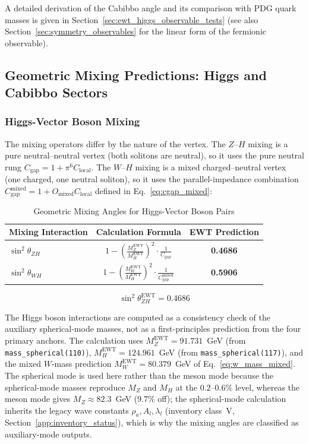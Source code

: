 \documentclass[10pt,a4paper]{article}
\begin{document}
A detailed derivation of the Cabibbo angle and its comparison with
PDG quark masses is given in Section~\ref{sec:ewt_higgs_observable_tests}
(see also Section~\ref{sec:symmetry_observables} for the linear form
of the fermionic observable).

\subsection{Geometric Mixing Predictions: Higgs and Cabibbo Sectors}

\subsubsection{Higgs-Vector Boson Mixing}

The mixing operators differ by the nature of the vertex. The
$Z$--$H$ mixing is a pure neutral--neutral vertex (both solitons are
neutral), so it uses the pure neutral rung $C_{\text{gap}} = 1 + \pi^6
C_{\text{local}}$. The $W$--$H$ mixing is a mixed charged--neutral
vertex (one charged, one neutral soliton), so it uses the
parallel-impedance combination $C_{\text{gap}}^{\text{mixed}} = 1 +
O_{\text{mixed}} C_{\text{local}}$ defined in
Eq.~\eqref{eq:cgap_mixed}:

\begin{table}[h]
	\centering
	\small
	\caption{Geometric Mixing Angles for Higgs-Vector Boson Pairs}
	\label{tab:higgs_mixing_variants}
	\begin{tabular}{lcc}
		\toprule
		\textbf{Mixing Interaction} & \textbf{Calculation Formula} & \textbf{EWT Prediction} \\
		\midrule
		$\sin^2\theta_{ZH}$ & $1 - \left( \frac{M_Z^{\text{EWT}}}{M_H^{\text{EWT}}} \right)^2 \cdot \frac{1}{C_{\text{gap}}}$ & \textbf{0.4686} \\
		$\sin^2\theta_{WH}$ & $1 - \left( \frac{M_W^{\text{EWT}}}{M_H^{\text{EWT}}} \right)^2 \cdot \frac{1}{C_{\text{gap}}^{\text{mixed}}}$ & \textbf{0.5906} \\
		\bottomrule
	\end{tabular}
\end{table}

\begin{equation}
	\label{eq:higgs_z_falsification}
	\boxed{\sin^2\theta_{ZH}^{\text{EWT}} = \mathbf{0.4686}}
\end{equation}

The Higgs boson interactions are computed as a consistency check of the
auxiliary spherical-mode masses, not as a first-principles prediction
from the four primary anchors. The calculation uses
$M_Z^{\text{EWT}} = 91.731$~GeV (from \texttt{mass\_spherical(110)}),
$M_H^{\text{EWT}} = 124.961$~GeV (from \texttt{mass\_spherical(117)}),
and the mixed $W$-mass prediction $M_W^{\text{EWT}} = 80.379$~GeV of
Eq.~\eqref{eq:w_mass_mixed}. The spherical mode is used here rather than
the meson mode because the spherical-mode masses reproduce $M_Z$ and
$M_H$ at the $0.2$--$0.6\%$ level, whereas the meson mode gives
$M_Z \approx 82.3$~GeV ($9.7\%$ off); the spherical-mode calculation
inherits the legacy wave constants $\rho_a, A_l, \lambda_l$
(inventory class~V, Section~\ref{app:inventory_status}), which is why
the mixing angles are classified as auxiliary-mode outputs.
\end{document}
